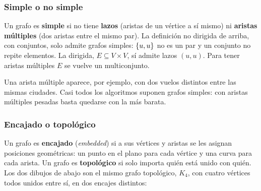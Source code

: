 \documentclass[11pt,letterpaper]{article}
\begin{document}
\subsubsection*{Simple o no simple}

Un grafo es \textbf{simple} si no tiene \textbf{lazos} (aristas de un
vértice a sí mismo) ni \textbf{aristas múltiples} (dos aristas entre
el mismo par). La definición no dirigida de arriba, con conjuntos,
solo admite grafos simples: $\left\{ u, u \right\}$ no es un par y un conjunto no
repite elementos. La dirigida, $E \subseteq V \times V$, sí admite
lazos $(u, u)$. Para tener aristas múltiples $E$ se vuelve un
multiconjunto.

\begin{center}
\end{center}

Una arista múltiple aparece, por ejemplo, con dos vuelos distintos
entre las mismas ciudades. Casi todos los algoritmos suponen grafos
simples: con aristas múltiples pesadas basta quedarse con la más
barata.

\subsubsection*{Encajado o topológico}

Un grafo es \textbf{encajado} (\textit{embedded}) si a sus vértices y
aristas se les asignan posiciones geométricas: un punto en el plano
para cada vértice y una curva para cada arista. Un grafo es
\textbf{topológico} si solo importa quién está unido con quién. Los
dos dibujos de abajo son el mismo grafo topológico, $K_4$, con cuatro
vértices todos unidos entre sí, en dos encajes distintos:
\end{document}
